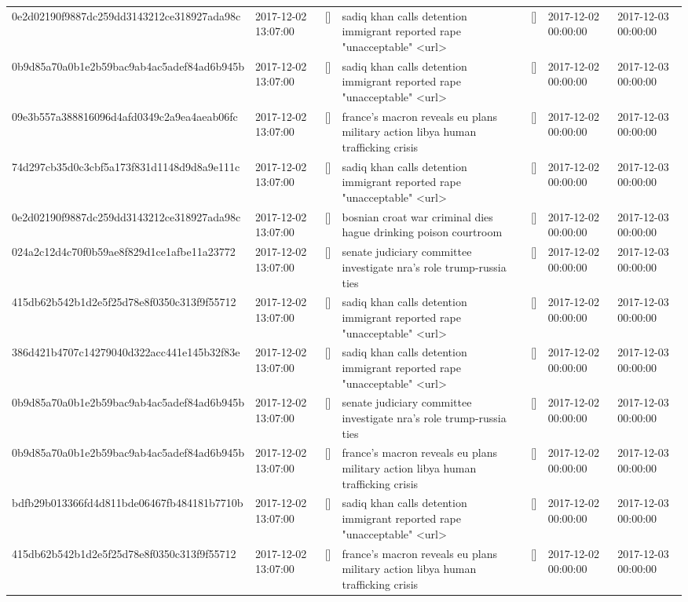 \begin{tabular}{lllllll}
0e2d02190f9887dc259dd3143212ce318927ada98c & 2017-12-02 13:07:00 & [] & sadiq khan calls detention immigrant reported rape "unacceptable" <url> & [] & 2017-12-02 00:00:00 & 2017-12-03 00:00:00 \\
0b9d85a70a0b1e2b59bac9ab4ac5adef84ad6b945b & 2017-12-02 13:07:00 & [] & sadiq khan calls detention immigrant reported rape "unacceptable" <url> & [] & 2017-12-02 00:00:00 & 2017-12-03 00:00:00 \\
09e3b557a388816096d4afd0349c2a9ea4aeab06fc & 2017-12-02 13:07:00 & [] & france's macron reveals eu plans military action libya human trafficking crisis & [] & 2017-12-02 00:00:00 & 2017-12-03 00:00:00 \\
74d297cb35d0c3cbf5a173f831d1148d9d8a9e111c & 2017-12-02 13:07:00 & [] & sadiq khan calls detention immigrant reported rape "unacceptable" <url> & [] & 2017-12-02 00:00:00 & 2017-12-03 00:00:00 \\
0e2d02190f9887dc259dd3143212ce318927ada98c & 2017-12-02 13:07:00 & [] & bosnian croat war criminal dies hague drinking poison courtroom & [] & 2017-12-02 00:00:00 & 2017-12-03 00:00:00 \\
024a2c12d4c70f0b59ae8f829d1ce1afbe11a23772 & 2017-12-02 13:07:00 & [] & senate judiciary committee investigate nra's role trump-russia ties & [] & 2017-12-02 00:00:00 & 2017-12-03 00:00:00 \\
415db62b542b1d2e5f25d78e8f0350c313f9f55712 & 2017-12-02 13:07:00 & [] & sadiq khan calls detention immigrant reported rape "unacceptable" <url> & [] & 2017-12-02 00:00:00 & 2017-12-03 00:00:00 \\
386d421b4707c14279040d322acc441e145b32f83e & 2017-12-02 13:07:00 & [] & sadiq khan calls detention immigrant reported rape "unacceptable" <url> & [] & 2017-12-02 00:00:00 & 2017-12-03 00:00:00 \\
0b9d85a70a0b1e2b59bac9ab4ac5adef84ad6b945b & 2017-12-02 13:07:00 & [] & senate judiciary committee investigate nra's role trump-russia ties & [] & 2017-12-02 00:00:00 & 2017-12-03 00:00:00 \\
0b9d85a70a0b1e2b59bac9ab4ac5adef84ad6b945b & 2017-12-02 13:07:00 & [] & france's macron reveals eu plans military action libya human trafficking crisis & [] & 2017-12-02 00:00:00 & 2017-12-03 00:00:00 \\
bdfb29b013366fd4d811bde06467fb484181b7710b & 2017-12-02 13:07:00 & [] & sadiq khan calls detention immigrant reported rape "unacceptable" <url> & [] & 2017-12-02 00:00:00 & 2017-12-03 00:00:00 \\
415db62b542b1d2e5f25d78e8f0350c313f9f55712 & 2017-12-02 13:07:00 & [] & france's macron reveals eu plans military action libya human trafficking crisis & [] & 2017-12-02 00:00:00 & 2017-12-03 00:00:00 \\

\end{tabular}
